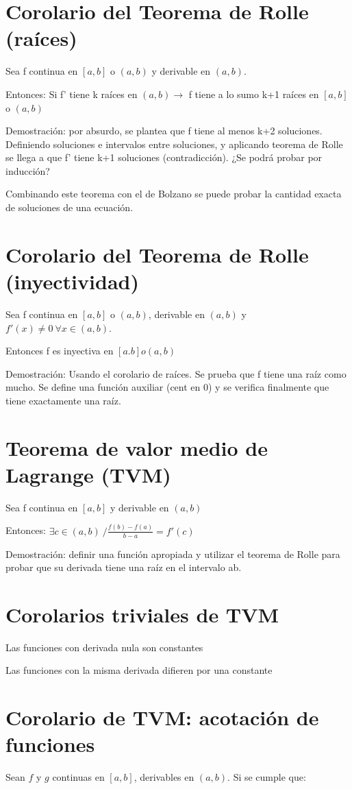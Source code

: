 \documentclass{report}
\begin{document}
	\section{Corolario del Teorema de Rolle (raíces)}
		Sea f continua en $[a,b]$ o $(a,b)$ y derivable en $(a,b)$.
		
		Entonces: Si f' tiene k raíces en $(a,b) \rightarrow$ f tiene a lo sumo k+1 raíces en $[a,b]$ o $(a,b)$
		
		Demostración: por absurdo, se plantea que f tiene al menos k+2 soluciones. Definiendo soluciones e intervalos entre soluciones, y aplicando teorema de Rolle se llega a que f' tiene k+1 soluciones (contradicción). ¿Se podrá probar por inducción?
		
		Combinando este teorema con el de Bolzano se puede probar la cantidad exacta de soluciones de una ecuación.
		
	\section{Corolario del Teorema de Rolle (inyectividad)}
		Sea f continua en $[a,b]$ o $(a,b)$, derivable en $(a,b)$ y $f'(x) \neq 0 \ \forall x \in (a,b)$.
		
		Entonces f es inyectiva en $[a.b] o (a,b)$
		
		Demostración: Usando el corolario de raíces. Se prueba que f tiene una raíz como mucho. Se define una función auxiliar (cent en 0) y se verifica finalmente que tiene exactamente una raíz.
		
	\section{Teorema de valor medio de Lagrange (TVM)}
		Sea f continua en $[a,b]$ y derivable en $(a,b)$
		
		Entonces: $\exists c \in (a,b) \ / \frac{f(b)-f(a)}{b-a} = f'(c)$
		
		Demostración: definir una función apropiada y utilizar el teorema de Rolle para probar que su derivada tiene una raíz en el intervalo ab.
		
	\section{Corolarios triviales de TVM}
		Las funciones con derivada nula son constantes
		
		Las funciones con la misma derivada difieren por una constante
		
	\section{Corolario de TVM: acotación de funciones}
		Sean $f$ y $g$ continuas en $[a,b]$, derivables en $(a,b)$. Si se cumple que:
		
\end{document}
